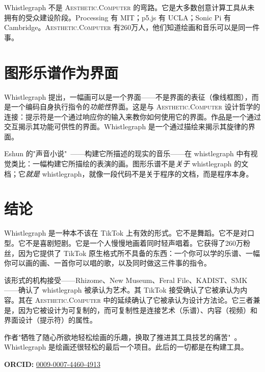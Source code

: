 \documentclass[10pt,letterpaper,twocolumn]{article}
\newcommand{\ac}{\textsc{Aesthetic.Computer}}
\begin{document}
Whistlegraph 不是 \ac{} 的弯路。它是大多数创意计算工具从未拥有的受众建设阶段。Processing 有 MIT；p5.js 有 UCLA；Sonic Pi 有 Cambridge。\ac{} 有260万人，他们知道绘画和音乐可以是同一件事。

\section{图形乐谱作为界面}

Whistlegraph 提出，一幅画可以是一个界面——不是界面的表征（像线框图），而是一个编码自身执行指令的\emph{功能性}界面。这是与 \ac{} 设计哲学的连接：提示符是一个通过响应你的输入来教你如何使用它的界面。作品是一个通过交互揭示其功能可供性的界面。Whistlegraph 是一个通过描绘来揭示其旋律的界面。

Eshun 的"声音小说"~\citep{eshun1998more}——构建它所描述的现实的音乐——在 whistlegraph 中有视觉类比：一幅构建它所描绘的表演的画。图形乐谱不是\emph{关于} whistlegraph 的文档；它\emph{就是} whistlegraph，就像一段代码不是关于程序的文档，而是程序本身。

\section{结论}

Whistlegraph 是一种本不该在 TikTok 上有效的形式。它不是舞蹈。它不是对口型。它不是喜剧短剧。它是一个人慢慢地画着同时轻声唱着。它获得了260万粉丝，因为它提供了 TikTok 原生格式所不具备的东西：一个你可以学的乐谱、一幅你可以画的画、一首你可以唱的歌，以及同时做这三件事的指令。

该形式的机构接受——Rhizome、New Museum、Feral File、KADIST、SMK——确认了 whistlegraph 被承认为艺术。其 TikTok 接受确认了它被承认为内容。其在 \ac{} 中的延续确认了它被承认为设计方法论。它三者兼是，因为它被设计为可复制的，而可复制性是连接艺术（乐谱）、内容（视频）和界面设计（提示符）的属性。

作者"牺牲了随心所欲地轻松绘画的乐趣，换取了推进其工具技艺的痛苦"~\citep{scudder2019drawing}。Whistlegraph 是绘画还很轻松的最后一个项目。此后的一切都是在构建工具。

\vspace{0.5em}
\noindent\textbf{ORCID:} \href{https://orcid.org/0009-0007-4460-4913}{0009-0007-4460-4913}



\end{document}
